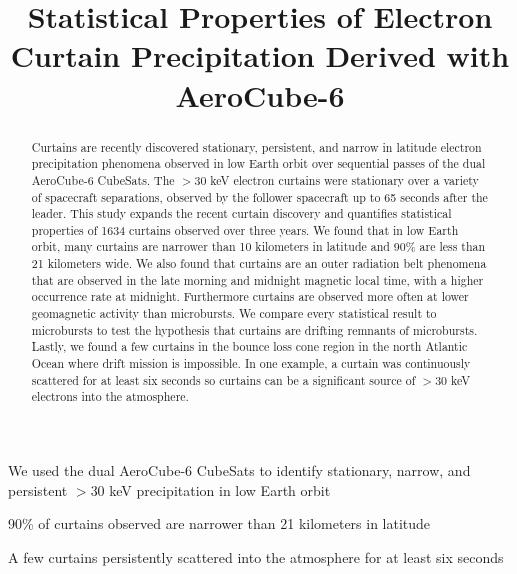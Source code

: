 \documentclass[draft]{agujournal2019}
\begin{document}
\title{Statistical Properties of Electron Curtain Precipitation Derived with AeroCube-6}

%
%






\begin{keypoints}
\item We used the dual AeroCube-6 CubeSats to identify stationary, narrow, and persistent $>30$ keV precipitation in low Earth orbit
\item 90\% of curtains observed are narrower than 21 kilometers in latitude
\item A few curtains persistently scattered into the atmosphere for at least six seconds
\end{keypoints}


\begin{abstract}
Curtains are recently discovered stationary, persistent, and narrow in latitude electron precipitation phenomena observed in low Earth orbit over sequential passes of the dual AeroCube-6 CubeSats. The $> 30$ keV electron curtains were stationary over a variety of spacecraft separations, observed by the follower spacecraft up to 65 seconds after the leader. This study expands the recent curtain discovery and quantifies statistical properties of 1634 curtains observed over three years. We found that in low Earth orbit, many curtains are narrower than 10 kilometers in latitude and 90\% are less than 21 kilometers wide. We also found that curtains are an outer radiation belt phenomena that are observed in the late morning and midnight magnetic local time, with a higher occurrence rate at midnight. Furthermore curtains are observed more often at lower geomagnetic activity than microbursts.  We compare every statistical result to microbursts to test the hypothesis that curtains are drifting remnants of microbursts. Lastly, we found a few curtains in the bounce loss cone region in the north Atlantic Ocean where drift mission is impossible. In one example, a curtain was continuously scattered for at least six seconds so curtains can be a significant source of $> 30$ keV electrons into the atmosphere.
\end{abstract}
\end{document}
